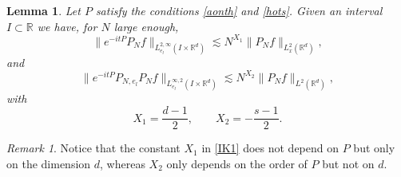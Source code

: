 \documentclass[aihp]{imsart}
\numberwithin{equation}{section}
\theoremstyle{plain}
\newtheorem{lem}[thm]{Lemma}
\theoremstyle{remark}
\newtheorem{rmq}[thm]{Remark}
\newcommand{\R}{\mathbb{R}}
\begin{document}
\begin{lem}
\label{1lemIK}
Let \(P\) satisfy the conditions \eqref{aonth} and \eqref{hots}. Given an interval $I\subset \R$ we have, for $N$ large enough,
\begin{equation}\label{IK1}
\| e^{-it P }  P_N f\|_{L_{e_l}^{2,\infty} (I\times \R^d)}\lesssim N^{X_1} \|P_N f\|_{L_x^2 (\R^d )},
\end{equation}
and
\begin{equation}
\label{IK3}
\|e^{-it P}  P_{N, e_l }  P_N f \|_{L_{e_l}^{\infty ,2} (I \times \R^d)} \lesssim N^{X_2} \|P_N f\|_{L^2 (\R^d )},
\end{equation}
with
$$X_1 =\dfrac{d-1}{2} ,\qquad X_2= -\dfrac{s-1}{2}.$$
\end{lem}
\begin{rmq}
Notice that the constant $X_1$ in \eqref{IK1} does not depend on $P$ but only on the dimension $d$, whereas $X_2$ only depends on the order of $P$ but not on $d$.
\end{rmq}
\end{document}
